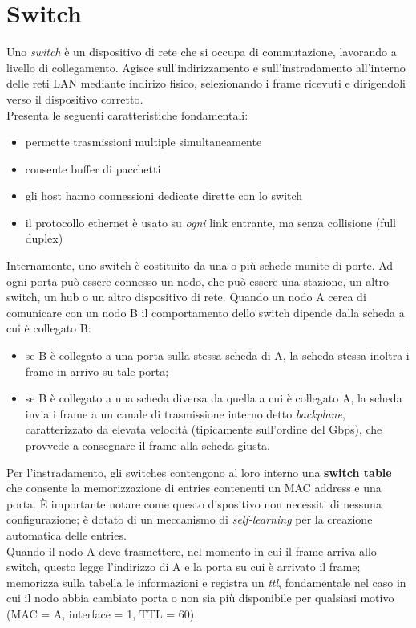 \section{Switch}
Uno \textit{switch} è un dispositivo di rete che si occupa di commutazione, lavorando a livello di collegamento. Agisce sull'indirizzamento e sull'instradamento all'interno delle reti LAN mediante indirizo fisico, selezionando i frame ricevuti e dirigendoli verso il dispositivo corretto.\\
Presenta le seguenti caratteristiche fondamentali:
\begin{itemize}
	\item permette trasmissioni multiple simultaneamente
	\item consente buffer di pacchetti
	\item gli host hanno connessioni dedicate dirette con lo switch
	\item il protocollo ethernet è usato su \textit{ogni} link entrante, ma senza collisione (full duplex)
\end{itemize}
Internamente, uno switch è costituito da una o più schede munite di porte. Ad ogni porta può essere connesso un nodo, che può essere una stazione, un altro switch, un hub o un altro dispositivo di rete.
Quando un nodo A cerca di comunicare con un nodo B il comportamento dello switch dipende dalla scheda a cui è collegato B:
\begin{itemize}
	\item se B è collegato a una porta sulla stessa scheda di A, la scheda stessa inoltra i frame in arrivo su tale porta;
	\item se B è collegato a una scheda diversa da quella a cui è collegato A, la scheda invia i frame a un canale di trasmissione interno detto \textit{backplane}, caratterizzato da elevata velocità (tipicamente sull'ordine del Gbps), che provvede a consegnare il frame alla scheda giusta.
\end{itemize}
Per l'instradamento, gli switches contengono al loro interno una \textbf{switch table} che consente la memorizzazione di entries contenenti un MAC address e una porta. È importante notare come questo dispositivo non necessiti di nessuna configurazione; è dotato di un meccanismo di \textit{self-learning} per la creazione automatica delle entries.\\
Quando il nodo A deve trasmettere, nel momento in cui il frame arriva allo switch, questo legge l'indirizzo di A e la porta su cui è arrivato il frame; memorizza sulla tabella le informazioni e registra un \textit{ttl}, fondamentale nel caso in cui il nodo abbia cambiato porta o non sia più disponibile per qualsiasi motivo (MAC = A, interface = 1, TTL = 60).\\
